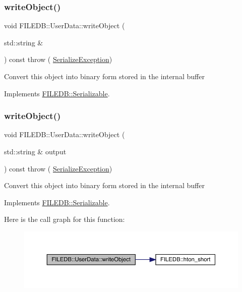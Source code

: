 \subsubsection{\texorpdfstring{writeObject()}{writeObject()}\hspace{0.1cm}{\footnotesize\ttfamily [2/3]}}
{\footnotesize\ttfamily void F\+I\+L\+E\+D\+B\+::\+User\+Data\+::write\+Object (\begin{DoxyParamCaption}\item[{std\+::string \&}]{ }\end{DoxyParamCaption}) const throw ( \mbox{\hyperlink{classFILEDB_1_1SerializeException}{Serialize\+Exception}}) \hspace{0.3cm}{\ttfamily [virtual]}}

Convert this object into binary form stored in the internal buffer 

Implements \mbox{\hyperlink{classFILEDB_1_1Serializable_a8deaa86e108c08c863881e46cf5578ea}{F\+I\+L\+E\+D\+B\+::\+Serializable}}.

\mbox{\label{classFILEDB_1_1UserData_a42b5e25b3cba7274363590c5b6861795}} 
\subsubsection{\texorpdfstring{writeObject()}{writeObject()}\hspace{0.1cm}{\footnotesize\ttfamily [3/3]}}
{\footnotesize\ttfamily void F\+I\+L\+E\+D\+B\+::\+User\+Data\+::write\+Object (\begin{DoxyParamCaption}\item[{std\+::string \&}]{output }\end{DoxyParamCaption}) const throw ( \mbox{\hyperlink{classFILEDB_1_1SerializeException}{Serialize\+Exception}}) \hspace{0.3cm}{\ttfamily [virtual]}}

Convert this object into binary form stored in the internal buffer 

Implements \mbox{\hyperlink{classFILEDB_1_1Serializable_a8deaa86e108c08c863881e46cf5578ea}{F\+I\+L\+E\+D\+B\+::\+Serializable}}.

Here is the call graph for this function\+:
\nopagebreak
\begin{figure}[H]
\begin{center}
\leavevmode
\includegraphics[width=350pt]{dc/d12/classFILEDB_1_1UserData_a42b5e25b3cba7274363590c5b6861795_cgraph}
\end{center}
\end{figure}


